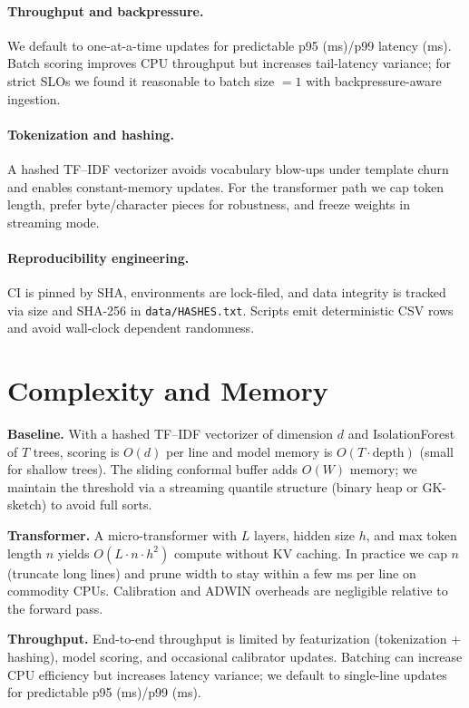 \documentclass[10pt,twocolumn]{article}
\begin{document}
\paragraph{Throughput and backpressure.} We default to one-at-a-time updates for predictable p95 (ms)/p99 latency (ms). Batch scoring improves CPU throughput but increases tail-latency variance; for strict SLOs we found it reasonable to batch size $=1$ with backpressure-aware ingestion.
\paragraph{Tokenization and hashing.} A hashed TF--IDF vectorizer avoids vocabulary blow-ups under template churn and enables constant-memory updates. For the transformer path we cap token length, prefer byte/character pieces for robustness, and freeze weights in streaming mode.
\paragraph{Reproducibility engineering.} CI is pinned by SHA, environments are lock-filed, and data integrity is tracked via size and SHA-256 in \texttt{data/HASHES.txt}. Scripts emit deterministic CSV rows and avoid wall-clock dependent randomness.
\section{Complexity and Memory}
\textbf{Baseline.} With a hashed TF--IDF vectorizer of dimension $d$ and IsolationForest of $T$ trees, scoring is $O(d)$ per line and model memory is $O(T \cdot \text{depth})$ (small for shallow trees). The sliding conformal buffer adds $O(W)$ memory; we maintain the threshold via a streaming quantile structure (binary heap or GK-sketch) to avoid full sorts.

\textbf{Transformer.} A micro-transformer with $L$ layers, hidden size $h$, and max token length $n$ yields $O(L \cdot n \cdot h^2)$ compute without KV caching. In practice we cap $n$ (truncate long lines) and prune width to stay within a few ms per line on commodity CPUs. Calibration and ADWIN overheads are negligible relative to the forward pass.

\textbf{Throughput.} End-to-end throughput is limited by featurization (tokenization + hashing), model scoring, and occasional calibrator updates. Batching can increase CPU efficiency but increases latency variance; we default to single-line updates for predictable p95 (ms)/p99 (ms).
\end{document}

